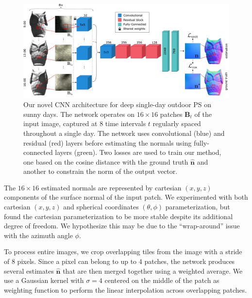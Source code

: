 \begin{figure}[t]
	\centering
	\includegraphics[width=0.8\linewidth]{figures/architecture.pdf}
	\caption[Method overview and model architecture]{Our novel CNN architecture for deep single-day outdoor PS on sunny days. The network operates on $16 \times 16$ patches $\mathbf{B}_t$ of the input image, captured at 8 time intervals $t$ regularly spaced throughout a single day. The network uses convolutional (blue) and residual (red) layers before estimating the normals using fully-connected layers (green). Two losses are used to train our method, one based on the cosine distance with the ground truth $\mathbf{\hat{n}}$ and another to constrain the norm of the output vector.}
	\label{fig:architecture}
\end{figure}


The $16 \times 16$ estimated normals are represented by cartesian $(x,y,z)$ components of the surface normal of the input patch. We experimented with both cartesian $(x,y,z)$ and spherical coordinates $(\theta,\phi)$ parameterization, but found the cartesian parameterization to be more stable despite its additional degree of freedom. We hypothesize this may be due to the ``wrap-around'' issue with the azimuth angle $\phi$. 

To process entire images, we crop overlapping tiles from the image with a stride of 8 pixels. Since a pixel can belong to up to 4 patches, the network produces several estimates $\mathbf{\hat{n}}$ that are then merged together using a weighted average. We use a Gaussian kernel with $\sigma=4$ centered on the middle of the patch as weighting function to perform the linear interpolation across overlapping patches. %

